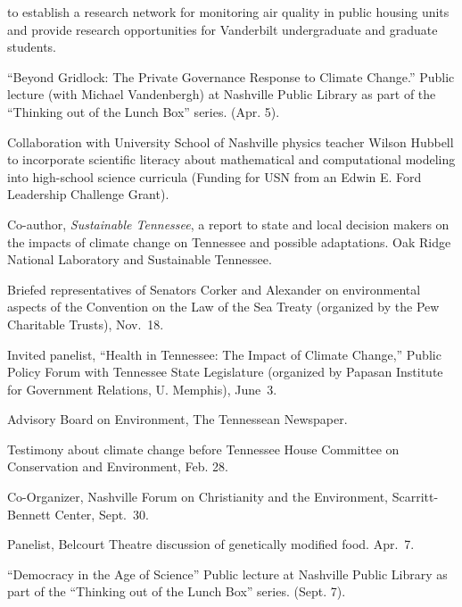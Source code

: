 to establish a research network for monitoring air quality in public housing units and provide research opportunities for Vanderbilt undergraduate and graduate students.
\item[2017] ``Beyond Gridlock: The Private Governance Response to Climate Change.'' Public lecture (with Michael Vandenbergh) at Nashville Public Library as part of the ``Thinking out of the Lunch Box'' series. (Apr. 5).
\item[2015--2017] Collaboration with University School of Nashville physics teacher Wilson Hubbell to incorporate scientific literacy about mathematical and computational modeling into high-school science curricula (Funding for USN from an Edwin E. Ford Leadership Challenge Grant).
\item[2011--2012] Co-author, \emph{Sustainable Tennessee}, a report to state and local decision makers on the impacts of climate change on Tennessee and possible adaptations. Oak Ridge National Laboratory and Sustainable Tennessee.
\item[2009] Briefed representatives of Senators Corker and Alexander on environmental aspects of the Convention on the Law of the Sea Treaty (organized by the Pew Charitable Trusts), Nov.~18.
\item[2009] Invited panelist, ``Health in Tennessee: The Impact of Climate Change,'' Public Policy Forum with Tennessee State Legislature (organized by Papasan Institute for Government Relations, U. Memphis), June~3.
\item[2007--2009] Advisory Board on Environment, The Tennessean Newspaper.
\item[2008] Testimony about climate change before Tennessee House Committee on Conservation and Environment, Feb. 28.
\item[2006] Co-Organizer, Nashville Forum on Christianity and the Environment, Scarritt-Bennett Center, Sept.~30.
\item[2006] Panelist, Belcourt Theatre discussion of genetically modified food. Apr.~7.
\item[2005] ``Democracy in the Age of Science'' Public lecture at Nashville Public Library as part of the ``Thinking out of the Lunch Box'' series. (Sept. 7).
